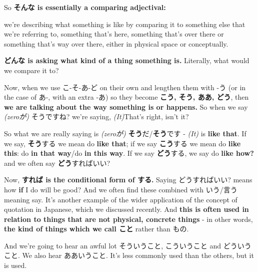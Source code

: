 \thinrule

So {\bf そんな is essentially a comparing adjectival:}

{}

we're describing what something is like by comparing it to something else that we're referring to, something that's here, something that's over there or something that's way over there, either in physical space or conceptually.

\thinrule

{\bf どんな is asking what kind of a thing something is.} Literally, what would we compare it to?

\stopsectionlevel

\startsectionlevel[title={こう, そう, ああ, どう},reference={こう-そう-ああ-どう}]

{}

Now, when we use こ-そ-あ-ど on their own and lengthen them with -う (or in the case of あ-, with an extra -あ) so they become {\bf こう, そう, ああ, どう}, then {\bf we are talking about the way something is or happens.} So when we say {\em (zeroが)} そうですね? we're saying, {\em (It)}That's right, isn't it?

{}

So what we are really saying is {\em (zeroが)} {\bf そう}だ/{\bf そう}です - {\em (It)} is {\bf like that}. If we say, {\bf そう}する we mean do {\bf like that}; if we say {\bf こう}する we mean do {\bf like this}: do {\bf in that way}/do {\bf in this way}. If we say {\bf どう}する, we say do {\bf like how?} and we often say {\bf どう}すればいい?

{}

Now, {\bf すれば is the conditional form of する.} Saying どうすればいい? means how {\bf if} I do will be good? And we often find these combined with いう/言う meaning say. It's another example of the wider application of the concept of quotation in Japanese, which we discussed recently. And {\bf this is often used in relation to things that are not physical, concrete things} - in other words, {\bf the kind of things which we call こと} rather than もの.

{}

And we're going to hear an awful lot そういうこと, こういうこと and どういうこと. We also hear ああいうこと. It's less commonly used than the others, but it is used.

